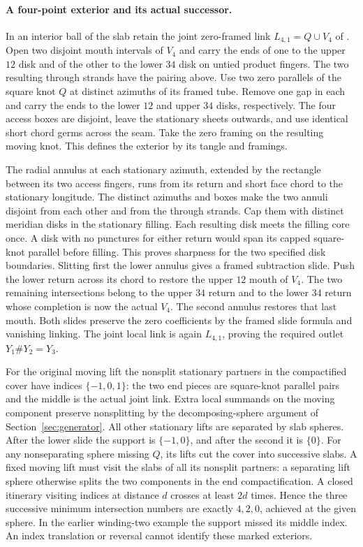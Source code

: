 \documentclass[11pt,letterpaper]{article}
\numberwithin{equation}{section}
\theoremstyle{remark}
\begin{document}
\paragraph{A four-point exterior and its actual successor.}
In an interior ball of the slab retain the joint zero-framed link
\(L_{4,1}=Q\cup V_4\) of \cite[Figure~1 and \S7]{GompfScharlemannThompson2010}.
Open two disjoint mouth intervals of \(V_4\) and carry the ends of
one to the upper \(12\) disk and of the other to the lower \(34\) disk
on untied product fingers. The two resulting through strands
have the pairing above. Use two zero parallels of the square knot
\(Q\) at distinct azimuths of its framed tube. Remove one gap in
each and carry the ends to the lower \(12\) and upper \(34\) disks,
respectively. The four access boxes are disjoint, leave the stationary
sheets outwards, and use identical short chord germs across the seam.
Take the zero framing on the resulting moving knot. This defines the
exterior by its tangle and framings.

The radial annulus at each stationary azimuth, extended by the
rectangle between its two access fingers, runs from its return
and short face chord to the stationary longitude. The distinct
azimuths and boxes make the two annuli disjoint from each other
and from the through strands. Cap them with distinct meridian
disks in the stationary filling. Each resulting disk meets the
filling core once. A disk with no punctures for either return would
span its capped square-knot parallel before filling. This proves
sharpness for the two specified disk boundaries. Slitting first the
lower annulus gives a framed subtraction slide. Push the lower
return across its chord to restore the upper \(12\) mouth of
\(V_4\). The two remaining intersections belong to the upper
\(34\) return and to the lower \(34\) return whose completion is
now the actual \(V_4\). The second annulus restores that last mouth.
Both slides preserve the zero coefficients by the framed slide
formula and vanishing linking. The joint local link is again
\(L_{4,1}\), proving the required outlet \(Y_1\#Y_2=Y_3\).

For the original moving lift the nonsplit stationary partners in
the compactified cover have indices \(\{-1,0,1\}\): the two end
pieces are square-knot parallel pairs and the middle is the actual
joint link. Extra local summands on the moving component preserve
nonsplitting by the decomposing-sphere argument of
Section~\ref{sec:generator}. All other stationary lifts are separated
by slab spheres. After the lower slide the support is \(\{-1,0\}\),
and after the second it is \(\{0\}\). For any nonseparating sphere
missing \(Q\), its lifts cut the cover into successive slabs.
A fixed moving lift must visit the slabs of all its nonsplit partners:
a separating lift sphere otherwise splits the two components in
the end compactification. A closed itinerary visiting indices at
distance \(d\) crosses at least \(2d\) times. Hence the three successive
minimum intersection numbers are exactly \(4,2,0\), achieved at the
given sphere. In the earlier winding-two example the support missed
its middle index. An index translation or reversal cannot identify
these marked exteriors.
\end{document}

